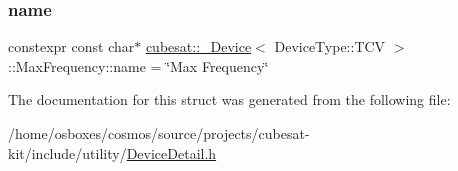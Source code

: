 \subsubsection{\texorpdfstring{name}{name}}
{\footnotesize\ttfamily constexpr const char$\ast$ \hyperlink{structcubesat_1_1__Device}{cubesat\+::\+\_\+\+Device}$<$ Device\+Type\+::\+T\+CV $>$\+::Max\+Frequency\+::name = \char`\"{}Max Frequency\char`\"{}\hspace{0.3cm}{\ttfamily [static]}}



The documentation for this struct was generated from the following file\+:\begin{DoxyCompactItemize}
\item 
/home/osboxes/cosmos/source/projects/cubesat-\/kit/include/utility/\hyperlink{DeviceDetail_8h}{Device\+Detail.\+h}\end{DoxyCompactItemize}
